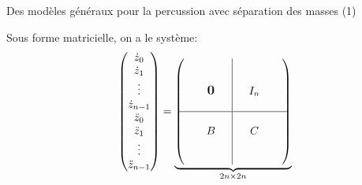 \begin{frame}{Des modèles généraux pour la percussion avec séparation des masses (1)}

	
	\small
	\vspace*{-0.1cm}
	Sous forme matricielle, on a le système:
	\begin{align} \label{eq:percussion1d4}
    \begin{pmatrix}
        \dot z_0 \\ \dot z_1 \\ \vdots \\ \dot z_{n-1} \\ \ddot z_0 \\ \ddot z_1 \\ \vdots \\ \ddot z_{n-1}
    \end{pmatrix}
    = 
    \underbrace{\begin{pmatrix}
        \begin{matrix}
       & & &  \\ & & &  \\ & & \bigzero & \\ & & & \\      
        \end{matrix}
        & \rvline 
        & \begin{matrix}
        & & & \\ & & &  \\ & I_n & & \\ & & & \\
        \end{matrix}  \\ 
        \hline
        \begin{matrix}
            & & &  \\ & & B & \\ & & & \\ & & & \\     
        \end{matrix}
        & \rvline 
        &\begin{matrix}
            & & & \\ & C & & \\ & & & \\ & & & \\        
        \end{matrix}
      \end{pmatrix}}_{2n \times 2n}

\end{align}
\end{frame}

